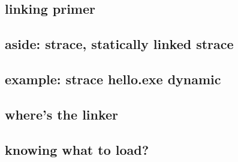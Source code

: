\subsection{linking primer}


\subsection{aside: strace, statically linked strace}



\subsection{example: strace hello.exe dynamic}



\subsection{where's the linker}



\subsection{knowing what to load?}



